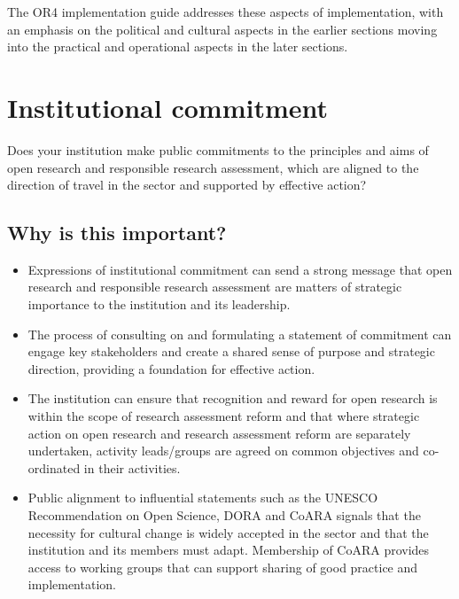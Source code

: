 \documentclass[
  letterpaper,
  DIV=11,
  numbers=noendperiod,
  oneside]{scrreprt}
\begin{document}
The OR4 implementation guide addresses these aspects of implementation,
with an emphasis on the political and cultural aspects in the earlier
sections moving into the practical and operational aspects in the later
sections.


\chapter{Institutional commitment}\label{institutional-commitment}

\begin{tcolorbox}[enhanced jigsaw, colback=white, toprule=.15mm, colframe=quarto-callout-color-frame, arc=.35mm, opacityback=0, bottomrule=.15mm, breakable, left=2mm, leftrule=.75mm, rightrule=.15mm]

Does your institution make public commitments to the principles and aims
of open research and responsible research assessment, which are aligned
to the direction of travel in the sector and supported by effective
action?

\end{tcolorbox}

\section{Why is this important?}\label{why-is-this-important}

\begin{itemize}
\item
  Expressions of institutional commitment can send a strong message that
  open research and responsible research assessment are matters of
  strategic importance to the institution and its leadership.
\item
  The process of consulting on and formulating a statement of commitment
  can engage key stakeholders and create a shared sense of purpose and
  strategic direction, providing a foundation for effective action.
\item
  The institution can ensure that recognition and reward for open
  research is within the scope of research assessment reform and that
  where strategic action on open research and research assessment reform
  are separately undertaken, activity leads/groups are agreed on common
  objectives and co-ordinated in their activities.
\item
  Public alignment to influential statements such as the UNESCO
  Recommendation on Open Science, DORA and CoARA signals that the
  necessity for cultural change is widely accepted in the sector and
  that the institution and its members must adapt. Membership of CoARA
  provides access to working groups that can support sharing of good
  practice and implementation.
\end{itemize}
\end{document}
